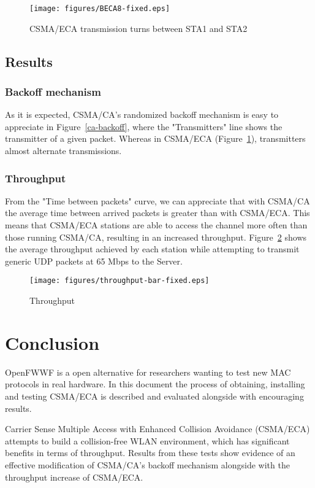 \documentclass[conference]{IEEEtran}
\begin{document}
\begin{figure}[htbp]
\centering
  \texttt{[image: figures/BECA8-fixed.eps]}
  \caption{CSMA/ECA transmission turns between STA1 and STA2}
  \label{eca-backoff}
\end{figure}

\subsection{Results}

\subsubsection*{Backoff mechanism}
As it is expected, CSMA/CA's randomized backoff mechanism is easy to appreciate in Figure~\ref{ca-backoff}, where the "Transmitters" line shows the transmitter of a given packet. Whereas in CSMA/ECA (Figure~\ref{eca-backoff}), transmitters almost alternate transmissions.

\subsubsection*{Throughput}
From the "Time between packets" curve, we can appreciate that with CSMA/CA the average time between arrived packets is greater than with CSMA/ECA. This means that CSMA/ECA stations are able to access the channel more often than those running CSMA/CA, resulting in an increased throughput. Figure~\ref{throughput} shows the average throughput achieved by each station while attempting to transmit generic UDP packets at 65 Mbps to the Server.

\begin{figure}[htbp]
\centering
  \texttt{[image: figures/throughput-bar-fixed.eps]}
  \caption{Throughput}
  \label{throughput}
\end{figure}

\section{Conclusion}
OpenFWWF is a open alternative for researchers wanting to test new MAC protocols in real hardware. In this document the process of obtaining, installing and testing CSMA/ECA is described and evaluated alongside with encouraging results.

Carrier Sense Multiple Access with Enhanced Collision Avoidance (CSMA/ECA) attempts to build a collision-free WLAN environment, which has significant benefits in terms of throughput. Results from these tests show evidence of an effective modification of CSMA/CA's backoff mechanism alongside with the throughput increase of CSMA/ECA.
\end{document}
